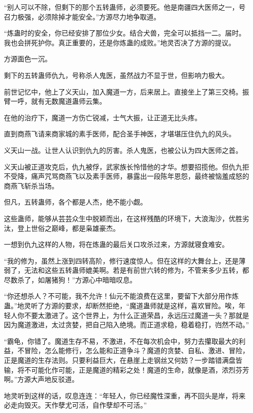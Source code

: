 \begin{this_body}
“别人可以不除，但剩下的那个五转蛊师，必须要死。他是南疆四大医师之一，号召力极强，必须除掉才能安全。”方源尽力地争取道。

“炼蛊时的安全，你已经安排了那位少女。结合犬兽，完全可以抵挡一二。届时。我也会拼死护你。真正重要的，还是你炼蛊的成败。”地灵否决了方源的提议。

方源面色一沉。

剩下的五转蛊师仇九，号称杀人鬼医，虽然战力不显于世，但影响力极大。

前世记忆中，他上了义天山，加入魔道一方，后来居上。直接坐上了第三交椅。振臂一呼，就有无数魔道蛊师云集。

在他的治疗下，魔道一方伤亡锐减，士气大振，让正道无比头疼。

直到商燕飞请来商家城的素手医师，配合圣手神医，才堪堪压住仇九的风头。

义天山一战。让世人认识到仇九的厉害。杀人鬼医，也被公认为四大医师之首。

义天山被正道攻克后，仇九被俘，武家族长怜惜他的才华。想要招揽他。但仇九拒不受降，痛声咒骂商燕飞以及素手医师，暴露出一段陈年恩怨，最终被恼羞成怒的商燕飞斩杀当场。

但凡，五转蛊师，各个都是人杰，绝不能小觑。

这些蛊师，能够从芸芸众生中脱颖而出，在这样残酷的环境下，大浪淘沙，优胜劣汰，登上世俗之巅峰，都是枭雄豪杰。

一想到仇九这样的人物，将在炼蛊的最后关口攻杀过来，方源就寝食难安。

“我的修为，虽然上涨到四转高阶，修行速度惊人。但在这样的大舞台上，还是薄弱了，无法和这些五转蛊师媲美啊。若是有前世六转的修为，不管来多少五转，都尽数杀了，如屠猪狗！”方源心中暗暗叹息。

“你还想杀人？不可能，我不允许！仙元不能浪费在这里，要留下大部分用作炼蛊。”地灵听了方源的要求，却断然拒绝，“魔道蛊师就是这样，喜欢冒险。唉，年轻人你不要太激进了。这个世界上，为什么正道荣昌，永远压过魔道一头？那就是因为魔道激进，太过贪婪，把自己陷入绝境。而正道求稳，稳着稳打，岿然不动。”

“霸龟，你错了。魔道生存不易，不激进，不在每次机会中，努力去攥取最大的利益，不冒险，怎么能修行，怎么能和正道争斗？魔道的贪婪、自私、激进、冒险，正是魔道的生存法则。只要利益巨大，在悬崖上走钢丝又何妨？一步踏错满盘皆输，将不可能化作可能，正是魔道的精彩之处！魔道的生命，就像是酒，浓烈芬芳啊。”方源大声地反驳道。

地灵听到这样的话，叹息连连：“年轻人，你已经魔性深重，再不回头是岸，将来必走向毁灭。天作孽尤可活，自作孽却不可活。”


\end{this_body}
